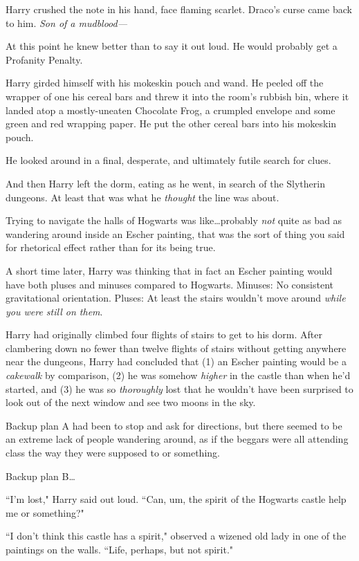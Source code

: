 Harry crushed the note in his hand, face flaming scarlet. Draco's curse came back to him. \emph{Son of a mudblood—}

At this point he knew better than to say it out loud. He would probably get a Profanity Penalty.

Harry girded himself with his mokeskin pouch and wand. He peeled off the wrapper of one his cereal bars and threw it into the room's rubbish bin, where it landed atop a mostly-uneaten Chocolate Frog, a crumpled envelope and some green and red wrapping paper. He put the other cereal bars into his mokeskin pouch.

He looked around in a final, desperate, and ultimately futile search for clues.

And then Harry left the dorm, eating as he went, in search of the Slytherin dungeons. At least that was what he \emph{thought} the line was about.

Trying to navigate the halls of Hogwarts was like…probably \emph{not} quite as bad as wandering around inside an Escher painting, that was the sort of thing you said for rhetorical effect rather than for its being true.

A short time later, Harry was thinking that in fact an Escher painting would have both pluses and minuses compared to Hogwarts. Minuses: No consistent gravitational orientation. Pluses: At least the stairs wouldn't move around \emph{while you were still on them}.

Harry had originally climbed four flights of stairs to get to his dorm. After clambering down no fewer than twelve flights of stairs without getting anywhere near the dungeons, Harry had concluded that (1) an Escher painting would be a \emph{cakewalk} by comparison, (2) he was somehow \emph{higher} in the castle than when he'd started, and (3) he was so \emph{thoroughly} lost that he wouldn't have been surprised to look out of the next window and see two moons in the sky.

Backup plan A had been to stop and ask for directions, but there seemed to be an extreme lack of people wandering around, as if the beggars were all attending class the way they were supposed to or something.

Backup plan B…

``I'm lost," Harry said out loud. ``Can, um, the spirit of the Hogwarts castle help me or something?"

``I don't think this castle has a spirit," observed a wizened old lady in one of the paintings on the walls. ``Life, perhaps, but not spirit."

